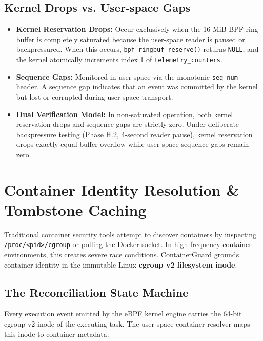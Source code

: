 \documentclass[11pt,a4paper]{article}
\begin{document}
\subsection{Kernel Drops vs. User-space Gaps}
\begin{itemize}
    \item \textbf{Kernel Reservation Drops:} Occur exclusively when the 16 MiB BPF ring buffer is completely saturated because the user-space reader is paused or backpressured. When this occurs, \texttt{bpf\_ringbuf\_reserve()} returns \texttt{NULL}, and the kernel atomically increments index 1 of \texttt{telemetry\_counters}.
    \item \textbf{Sequence Gaps:} Monitored in user space via the monotonic \texttt{seq\_num} header. A sequence gap indicates that an event was committed by the kernel but lost or corrupted during user-space transport.
    \item \textbf{Dual Verification Model:} In non-saturated operation, both kernel reservation drops and sequence gaps are strictly zero. Under deliberate backpressure testing (Phase H.2, 4-second reader pause), kernel reservation drops exactly equal buffer overflow while user-space sequence gaps remain zero.
\end{itemize}

\newpage


\section{Container Identity Resolution \& Tombstone Caching}

Traditional container security tools attempt to discover containers by inspecting \texttt{/proc/<pid>/cgroup} or polling the Docker socket. In high-frequency container environments, this creates severe race conditions. ContainerGuard grounds container identity in the immutable Linux \textbf{cgroup v2 filesystem inode}.

\subsection{The Reconciliation State Machine}
Every execution event emitted by the eBPF kernel engine carries the 64-bit cgroup v2 inode of the executing task. The user-space container resolver maps this inode to container metadata:
\end{document}
